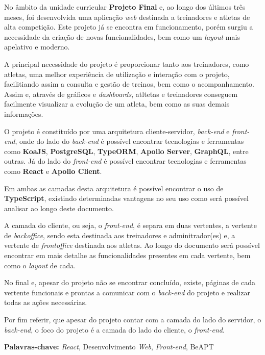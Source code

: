 
No âmbito da unidade curricular \textbf{Projeto Final} e, ao longo dos últimos três meses, foi desenvolvida uma aplicação \textit{web} destinada a treinadores e atletas de alta competição. Este projeto já se encontra em funcionamento, porém surgiu a necessidade da criação de novas funcionalidades, bem como um \textit{layout} mais apelativo e moderno.

A principal necessidade do projeto é proporcionar tanto aos treinadores, como atletas, uma melhor experiência de utilização e interação com o projeto, facilitiando assim a consulta e gestão de treinos, bem como o acompanhamento. Assim e, através de gráficos e \textit{dashboards}, atltetas e treinadores conseguem facilmente visualizar a evolução de um atleta, bem como as suas demais informações.

O projeto é constituído por uma arquitetura cliente-servidor, \textit{back-end} e \textit{front-end}, onde do lado do \textit{back-end} é possível encontrar tecnologias e ferramentas como \textbf{KoaJS}, \textbf{PostgreSQL}, \textbf{TypeORM}, \textbf{Apollo Server}, \textbf{GraphQL}, entre outras. Já do lado do \textit{front-end} é possível encontrar tecnologias e ferramentas como \textbf{React} e \textbf{Apollo Client}.

Em ambas as camadas desta arquitetura é possível encontrar o uso de \textbf{TypeScript}, existindo determinadas vantagens no seu uso como será possível analisar ao longo deste documento.

A camada do cliente, ou seja, o \textit{front-end}, é separa em duas vertentes, a vertente de \textit{backoffice}, sendo esta destinada aos treinadores e adminitrador(es) e, a vertente de \textit{frontoffice} destinada aos atletas. Ao longo do documento será possível encontrar em mais detalhe as funcionalidades presentes em cada vertente, bem como o \textit{layout} de cada.

No final e, apesar do projeto não se encontrar concluído, existe, páginas de cada vertente funcionais e prontas a comunicar com o \textit{back-end} do projeto e realizar todas as ações necessárias.

Por fim referir, que apesar do projeto contar com a camada do lado do servidor, o \textit{back-end}, o foco do projeto é a camada do lado do cliente, o \textit{front-end}.

\vfill

\textbf{Palavras-chave:} \textit{React}, Desenvolvimento \textit{Web}, \textit{Front-end}, BeAPT

\newpage